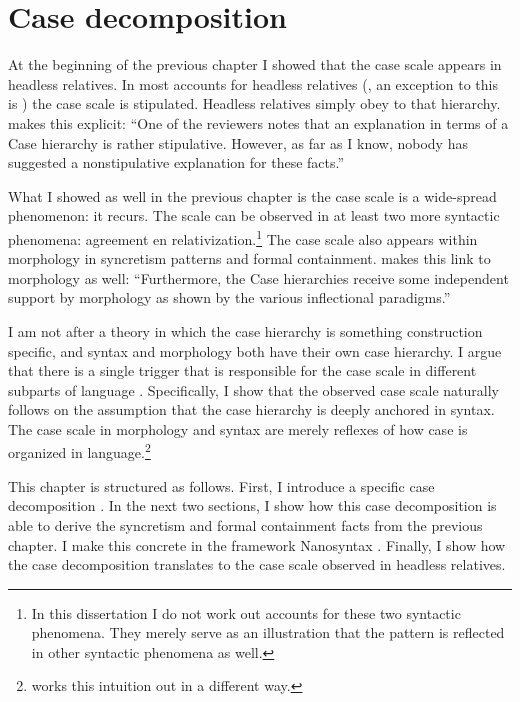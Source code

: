 
\chapter{Case decomposition}\label{ch:decomposition}

At the beginning of the previous chapter I showed that the case scale  appears in headless relatives. In most accounts for headless relatives (\citealt[cf.][]{pittner1995,vogel2001,grosu2003,harbert1978}, an exception to this is \citealt{himmelreich2017}) the case scale is stipulated. Headless relatives simply obey to that hierarchy.  makes this explicit: ``One of the reviewers notes that an explanation in terms of a Case hierarchy is rather stipulative. However, as far as I know, nobody has suggested a nonstipulative explanation for these facts.''

What I showed as well in the previous chapter is the case scale  is a wide-spread phenomenon: it recurs. The scale can be observed in at least two more syntactic phenomena: agreement en relativization.\footnote{
In this dissertation I do not work out accounts for these two syntactic phenomena. They merely serve as an illustration that the pattern is reflected in other syntactic phenomena as well.}
The case scale also appears within morphology in syncretism patterns and formal containment.  makes this link to morphology as well: ``Furthermore, the Case hierarchies receive some independent support by morphology as shown by the various inflectional paradigms.''

I am not after a theory in which the case hierarchy is something construction specific, and syntax and morphology both have their own case hierarchy. I argue that there is a single trigger that is responsible for the case scale in different subparts of language \citep[cf.][on numeral constructions]{caha2019}. Specifically, I show that the observed case scale naturally follows on the assumption that the case hierarchy is deeply anchored in syntax. The case scale in morphology and syntax are merely reflexes of how case is organized in language.\footnote{
\citet{himmelreich2017} works this intuition out in a different way.
}

This chapter is structured as follows. First, I introduce a specific case decomposition \citep{caha2009}. In the next two sections, I show how this case decomposition is able to derive the syncretism and formal containment facts from the previous chapter. I make this concrete in the framework Nanosyntax \citep{starke2009}. Finally, I show how the case decomposition translates to the case scale observed in headless relatives.


